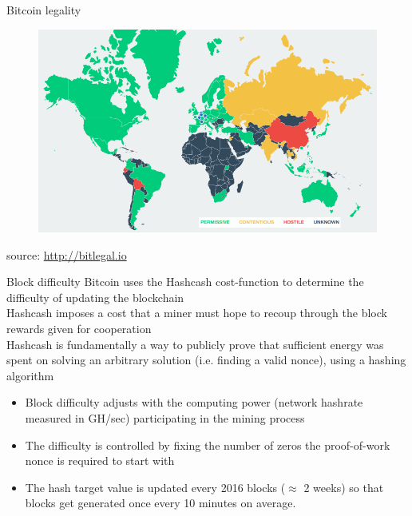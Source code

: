 \documentclass[9pt]{beamer}
\begin{document}
\begin{frame}{Bitcoin legality}
	\begin{figure}[]
		\centering
		\includegraphics  [scale=0.3]{Images/bitlegal}
	\end{figure}
		\begin{scriptsize}
		source: \href{http://bitlegal.io}{http://bitlegal.io}
	\end{scriptsize}
\end{frame}


\begin{frame}{Block difficulty}
	Bitcoin uses the Hashcash cost-function to determine the difficulty of updating the blockchain \\ \vspace{3mm}
	Hashcash imposes a cost that a miner must hope to recoup through the block rewards given for cooperation \\ \vspace{3mm}
	Hashcash is fundamentally a way to publicly prove that sufficient energy was spent on solving an arbitrary solution (i.e. finding a valid nonce), using a hashing algorithm
	\begin{itemize}
		\item Block difficulty adjusts with the computing power (network hashrate measured in GH/sec) participating in the mining process
		\item The difficulty is controlled by fixing the number of zeros the proof-of-work nonce is required to start with
		\item The hash target value is updated every 2016 blocks ($\approx$ 2 weeks) so that blocks get generated once every 10 minutes on average.
	\end{itemize}
\end{frame}
\end{document}
